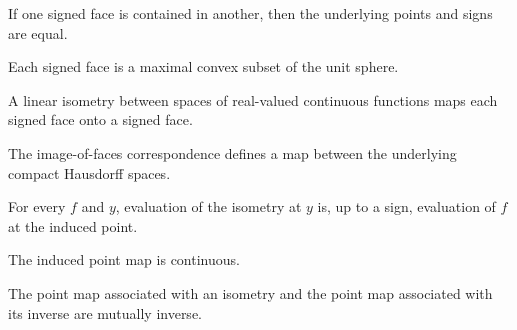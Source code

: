 \begin{lemma}
\label{lem:banach-stone-face-rigidity}
\leanok
{}
If one signed face is contained in another, then the underlying points and signs
are equal.
\end{lemma}

\begin{lemma}
\label{lem:banach-stone-face-maximal}
\leanok
{}
Each signed face is a maximal convex subset of the unit sphere.
\end{lemma}

\begin{lemma}
\label{lem:banach-stone-isometry-faces}
\leanok
{}
A linear isometry between spaces of real-valued continuous functions maps each
signed face onto a signed face.
\end{lemma}

\begin{definition}
\label{def:banach-stone-point-map}
\leanok
{}
The image-of-faces correspondence defines a map between the underlying compact
Hausdorff spaces.
\end{definition}

\begin{lemma}
\label{lem:banach-stone-map-apply}
\leanok
{}
For every $f$ and $y$, evaluation of the isometry at $y$ is, up to a sign,
evaluation of $f$ at the induced point.
\end{lemma}

\begin{lemma}
\label{lem:banach-stone-point-map-continuous}
\leanok
{}
The induced point map is continuous.
\end{lemma}

\begin{lemma}
\label{lem:banach-stone-point-map-inverse}
\leanok
{}
The point map associated with an isometry and the point map associated with its
inverse are mutually inverse.
\end{lemma}

